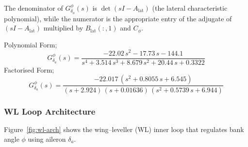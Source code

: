 The denominator of \(G^{\phi}_{\delta_a}(s)\) is \(\det(sI - A_{\mathrm{lat}})\) (the lateral characteristic polynomial), while the numerator is the appropriate entry of the adjugate of \((sI - A_{\mathrm{lat}})\) multiplied by \(B_{\mathrm{lat}}(:,1)\) and \(C_\phi\).

Polynomial Form;
\begin{equation}
G^{\phi}_{\delta_a}(s)
= \dfrac{-22.02\,s^{2} - 17.73\,s - 144.1}
        {s^{4} + 3.514\,s^{3} + 8.679\,s^{2} + 20.44\,s + 0.3322}
\end{equation}
Factorised Form;
\begin{equation}
G^{\phi}_{\delta_a}(s)
= \dfrac{-22.017\,(s^{2} + 0.8055\,s + 6.545)}
        {(s+2.924)\,(s+0.01636)\,(s^{2} + 0.5739\,s + 6.944)}
\end{equation}

\subsubsection{WL Loop Architecture}

Figure~\ref{fig:wl-arch} shows the wing–leveller (WL) inner loop that regulates
bank angle $\phi$ using aileron $\delta_a$.


